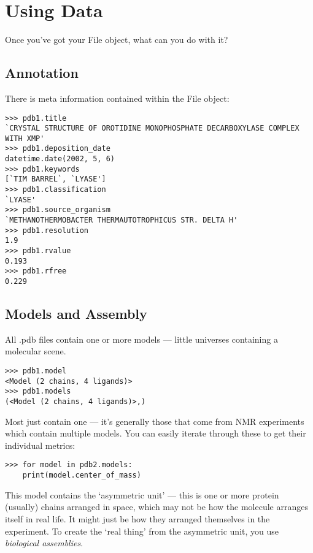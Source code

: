 \section{Using Data}

Once you've got your File object, what can you do with it?

\subsection{Annotation}

There is meta information contained within the File object:

\begin{footnotesize}
\begin{verbatim}
>>> pdb1.title
`CRYSTAL STRUCTURE OF OROTIDINE MONOPHOSPHATE DECARBOXYLASE COMPLEX WITH XMP'
>>> pdb1.deposition_date
datetime.date(2002, 5, 6)
>>> pdb1.keywords
[`TIM BARREL`, `LYASE']
>>> pdb1.classification
`LYASE'
>>> pdb1.source_organism
`METHANOTHERMOBACTER THERMAUTOTROPHICUS STR. DELTA H'
>>> pdb1.resolution
1.9
>>> pdb1.rvalue
0.193
>>> pdb1.rfree
0.229
\end{verbatim}
\end{footnotesize}

\subsection{Models and Assembly}

All .pdb files contain one or more models --- little universes containing a
molecular scene.

\begin{footnotesize}
\begin{verbatim}
>>> pdb1.model
<Model (2 chains, 4 ligands)>
>>> pdb1.models
(<Model (2 chains, 4 ligands)>,)
\end{verbatim}
\end{footnotesize}

Most just contain one --- it's generally those that come from NMR experiments which contain multiple models. You can easily iterate through these to get their individual metrics:

\begin{footnotesize}
\begin{verbatim}
>>> for model in pdb2.models:
    print(model.center_of_mass)
\end{verbatim}
\end{footnotesize}

This model contains the `asymmetric unit' --- this is one or more protein
(usually) chains arranged in space, which may not be how the molecule arranges
itself in real life. It might just be how they arranged themselves in the
experiment. To create the `real thing' from the asymmetric unit, you use
\emph{biological assemblies}.

